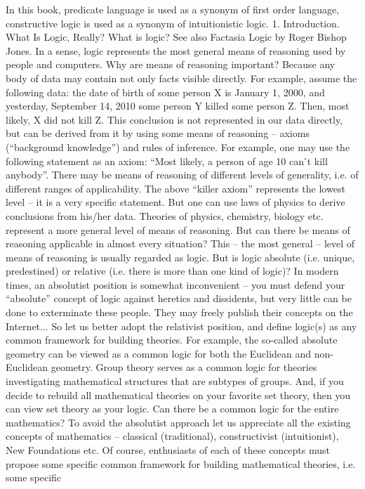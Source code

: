 In this book,
predicate language is used as a synonym of first order language,
constructive logic is used as a synonym of intuitionistic logic.
1. Introduction. What Is Logic, Really?
What is logic?
See also Factasia Logic by Roger Bishop Jones.
In a sense, logic represents the most general means of reasoning used by people and computers.
Why are means of reasoning important? Because any body of data may contain not only facts visible
directly. For example, assume the following data: the date of birth of some person X is January 1, 2000,
and yesterday, September 14, 2010 some person Y killed some person Z. Then, most likely, X did not kill
Z. This conclusion is not represented in our data directly, but can be derived from it by using some means
of reasoning – axioms (“background knowledge”) and rules of inference. For example, one may use the
following statement as an axiom: “Most likely, a person of age 10 can ́t kill anybody”.
There may be means of reasoning of different levels of generality, i.e. of different ranges of applicability.
The above “killer axiom” represents the lowest level – it is a very specific statement. But one can use
laws of physics to derive conclusions from his/her data. Theories of physics, chemistry, biology etc.
represent a more general level of means of reasoning. But can there be means of reasoning applicable in
almost every situation? This – the most general – level of means of reasoning is usually regarded as logic.
But is logic absolute (i.e. unique, predestined) or relative (i.e. there is more than one kind of logic)? In
modern times, an absolutist position is somewhat inconvenient – you must defend your “absolute”
concept of logic against heretics and dissidents, but very little can be done to exterminate these people.
They may freely publish their concepts on the Internet...
So let us better adopt the relativist position, and define logic(s) as any common framework for building
theories. For example, the so-called absolute geometry can be viewed as a common logic for both the
Euclidean and non-Euclidean geometry. Group theory serves as a common logic for theories investigating
mathematical structures that are subtypes of groups. And, if you decide to rebuild all mathematical
theories on your favorite set theory, then you can view set theory as your logic.
Can there be a common logic for the entire mathematics? To avoid the absolutist approach let us appreciate all the existing
concepts of mathematics – classical (traditional), constructivist (intuitionist), New Foundations etc. Of course, enthusiasts of
each of these concepts must propose some specific common framework for building mathematical theories, i.e. some specific
